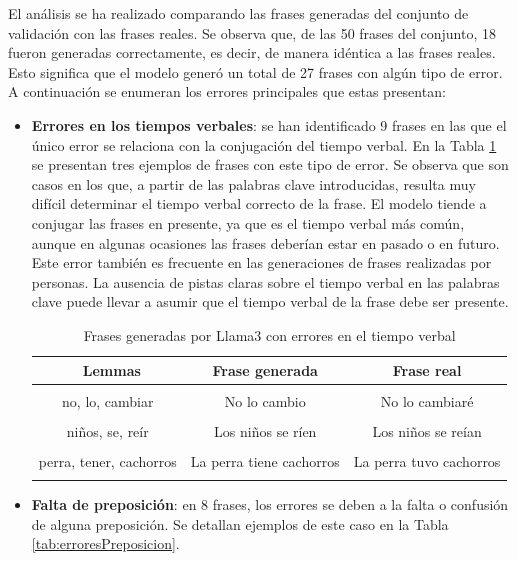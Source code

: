 \documentclass[11pt,spanish,listoffigures,listoftables]{tfgetsinf}
\begin{document}
El análisis se ha realizado comparando las frases generadas del conjunto de validación con las frases reales. Se observa que, de las 50 frases del conjunto, 18 fueron generadas correctamente, es decir, de manera idéntica a las frases reales. Esto significa que el modelo generó un total de 27 frases con algún tipo de error. A continuación se enumeran los errores principales que estas presentan:

\begin{itemize}
	\item \textbf{Errores en los tiempos verbales}: se han identificado 9 frases en las que el único error se relaciona con la conjugación del tiempo verbal. En la Tabla \ref{tab:erroresTiempoVerbal} se presentan tres ejemplos de frases con este tipo de error. Se observa que son casos en los que, a partir de las palabras clave introducidas, resulta muy difícil determinar el tiempo verbal correcto de la frase. El modelo tiende a conjugar las frases en presente, ya que es el tiempo verbal más común, aunque en algunas ocasiones las frases deberían estar en pasado o en futuro. Este error también es frecuente en las generaciones de frases realizadas por personas. La ausencia de pistas claras sobre el tiempo verbal en las palabras clave puede llevar a asumir que el tiempo verbal de la frase debe ser presente.

\begin{table}[!h]
\caption{Frases generadas por Llama3 con errores en el tiempo verbal}
\begin{center}
\begin{tabular}{ c | c | c }
	\ Lemmas & Frase generada & Frase real \\
	\hline
	\hline
	 & & \\
	 no, lo, cambiar & No lo cambio & No lo cambiaré  \\
	 & & \\
	niños, se, reír & Los niños se ríen & Los niños se reían\\
	 & & \\
	perra, tener, cachorros & La perra tiene cachorros & La perra tuvo cachorros \\
	 & & \\

\end{tabular}
\end{center}
\label{tab:erroresTiempoVerbal}
\end{table}

	\item \textbf{Falta de preposición}: en 8 frases, los errores se deben a la falta o confusión de alguna preposición. Se detallan ejemplos de este caso en la Tabla \ref{tab:erroresPreposicion}.


\end{itemize}
\end{document}

